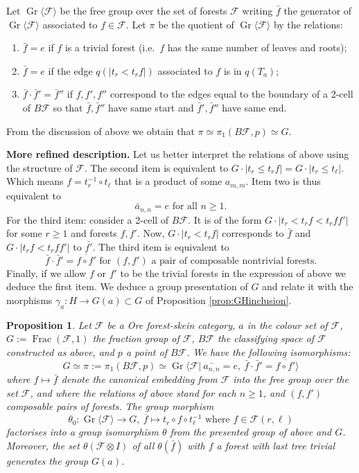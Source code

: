 \documentclass[a4paper, 12pt]{amsart}
\numberwithin{equation}{section}
\newtheorem{proposition}[theorem]{Proposition}
\theoremstyle{definition}
\newcommand{\cF}{\mathcal F}
\DeclareMathOperator{\Frac}{Frac}
\DeclareMathOperator{\Gr}{Gr}
\newcommand{\ga}{\gamma}
\newcommand{\la}{\langle}
\newcommand{\ot}{\otimes}
\newcommand{\ov}{\overline}
\newcommand{\ra}{\rangle}
\begin{document}
Let $\Gr\langle\cF\rangle$ be the free group over the set of forests $\cF$ writing $\bar f$ the generator of $\Gr\la \cF\ra$ associated to $f\in\cF$.
Let $\pi$ be the quotient of $\Gr\la\cF\ra$ by the relations: 
\begin{enumerate}
\item $\bar f =e$ if $f$ is a trivial forest (i.e.~$f$ has the same number of leaves and roots);\\
\item $\bar f =e$ if the edge $q(|t_r<t_rf|)$ associated to $f$ is in $q(T_a)$;\\
\item $\bar f \cdot \bar f'=\bar f''$ if $f,f',f''$ correspond to the edges equal to the boundary of a 2-cell of $B\cF$ so that $\bar f,\bar f''$ have same start and $\bar f',\bar f''$ have same end.
\end{enumerate}
From the discussion of above we obtain that $\pi\simeq \pi_1(B\cF,p)\simeq G$.

{\bf More refined description.}
Let us better interpret the relations of above using the structure of $\cF$. 
The second item is equivalent to $G\cdot |t_r\leq t_r f| = G\cdot | t_r\leq t_\ell |$. 
Which means $f=t_r^{-1}\circ t_\ell$ that is a product of some $a_{m,m}$.
Item two is thus equivalent to
$$\bar a_{n,n}=e \text{ for all } n\geq 1.$$
For the third item: consider a 2-cell of $B\cF$. It is of the form $G\cdot |t_r<t_r f<t_rff'|$ for some $r\geq 1$ and forests $f,f'.$
Now, $G\cdot |t_r<t_rf|$ corresponds to $\bar f$ and $G\cdot |t_rf< t_rff'|$ to $\bar{f'}.$
The third item is equivalent to
$$\bar f \cdot \bar f' = \ov{f\circ f'} \text{ for $(f,f')$ a pair of composable nontrivial forests.}$$
Finally, if we allow $f$ or $f'$ to be the trivial forests in the expression of above we deduce the first item.
We deduce a group presentation of $G$ and relate it with the morphisms $\ga_a:H\to G(a)\subset G$ of Proposition \ref{prop:GHinclusion}.

\begin{proposition}\label{prop:presentation-G}
Let $\cF$ be a Ore forest-skein category, $a$ in the colour set of $\cF$, $G:=\Frac(\cF,1)$ the fraction group of $\cF$, $B\cF$ the classifying space of $\cF$ constructed as above, and $p$ a point of $B\cF$.
We have the following isomorphisms:
\begin{equation}\label{eq:presentation-pi}G\simeq \pi:=\pi_1(B\cF,p)\simeq \Gr\langle \cF | \ \bar{a_{n,n}}=e,\ \bar f \cdot \bar f' = \ov{f\circ f'}\rangle\end{equation}
where $f\mapsto \bar f$ denote the canonical embedding from $\cF$ into the free group over the set $\cF$, and where the relations of above stand for each $n\geq 1$, and $(f,f')$ composable pairs of forests.
The group morphism
$$\theta_0:\Gr\la\cF\ra\to G,\ \ov f\mapsto t_r \circ f \circ t_\ell^{-1} \text{ where } f\in\cF(r,\ell)$$
factorises into a group isomorphism $\theta$ from the presented group of above and $G$. 
Moreover, the set $\theta(\cF\ot I)$ of all $\theta(\bar f)$ with $f$ a forest with last tree trivial generates the group $G(a)$.
\end{proposition}
\end{document}

